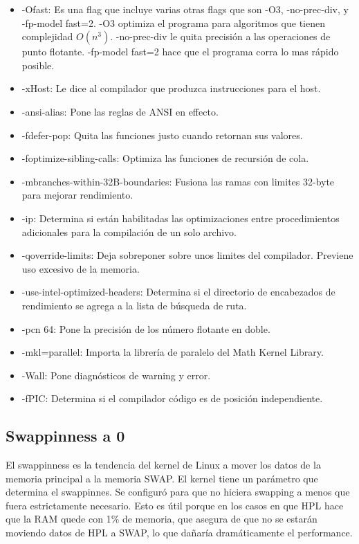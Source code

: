\begin{itemize}
    \item -Ofast: Es una flag que incluye varias otras flags que son -O3, -no-prec-div, y -fp-model fast=2. -O3 optimiza el programa para algoritmos que tienen complejidad $ O(n^3)$. -no-prec-div le quita precisión a las operaciones de punto flotante. -fp-model fast=2 hace que el programa corra lo mas rápido posible.
    \item -xHost: Le dice al compilador que produzca instrucciones para el host.\cite{intel-xhost}
    \item -ansi-alias: Pone las reglas de ANSI en effecto.
    \item -fdefer-pop: Quita las funciones justo cuando retornan sus valores.
    \item -foptimize-sibling-calls: Optimiza las funciones de recursión de cola.
    \item -mbranches-within-32B-boundaries: Fusiona las ramas con limites 32-byte para mejorar rendimiento.
    \item -ip: Determina si están habilitadas las optimizaciones entre procedimientos adicionales para la compilación de un solo archivo.
    \item -qoverride-limits: Deja sobreponer sobre unos limites del compilador. Previene uso excesivo de la memoria.
    \item -use-intel-optimized-headers: Determina si el directorio de encabezados de rendimiento se agrega a la lista de búsqueda de ruta.
    \item -pcn 64: Pone la precisión de los número flotante en doble.
    \item -mkl=parallel: Importa la librería de paralelo del Math Kernel Library.
    \item -Wall: Pone diagnósticos de warning y error.
    \item -fPIC: Determina si el compilador código es de posición independiente.
\end{itemize}

\subsection{Swappinness a 0}
El swappinness es la tendencia del kernel de Linux a mover los datos de la memoria principal a la memoria SWAP. El kernel tiene un parámetro que determina el swappinnes. Se configuró para que no hiciera swapping a menos que fuera estrictamente necesario. Esto es útil porque en los casos en que HPL hace que la RAM quede con 1\% de memoria, que asegura de que no se estarán moviendo datos de HPL a SWAP, lo que dañaría dramáticamente el performance.

